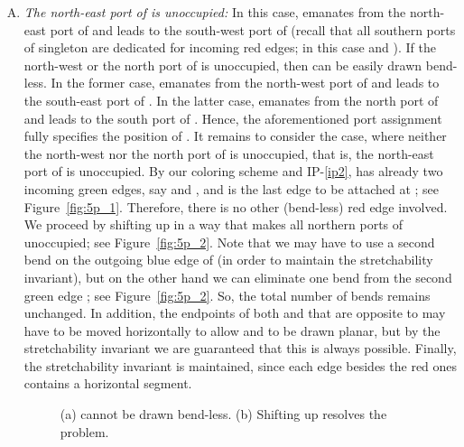 \documentclass[a4paper,twoside,11pt]{article}
\begin{document}
\begin{enumerate}[C.1:] 
  
\item \label{c1} \emph{The north-east port of  is unoccupied:}
In this case,  emanates from the north-east port of  and
leads to the south-west port of  (recall that all southern
ports of singleton  are dedicated for incoming red edges; in
this case  and ). If the north-west or the north port of
 is unoccupied, then  can be easily drawn bend-less. In
the former case,  emanates from the north-west port of 
and leads to the south-east port of . In the latter case, 
emanates from the north port of  and leads to the south port
of . Hence, the aforementioned port assignment fully specifies
the position of . It remains to consider the case, where
neither the north-west nor the north port of  is unoccupied,
that is, the north-east port of  is unoccupied. By our
coloring scheme and IP-\ref{ip2},  has already two incoming
green edges, say  and , and  is the last edge to be
attached at ; see Figure~\ref{fig:5p_1}. Therefore, there is
no other (bend-less) red edge involved. We proceed by shifting
 up in a way that makes all northern ports of 
unoccupied; see Figure~\ref{fig:5p_2}. Note that we may have to use
a second bend on the outgoing blue edge of  (in order to
maintain the stretchability invariant), but on the other hand we can
eliminate one bend from the second green edge ; see
Figure~\ref{fig:5p_2}. So, the total number of bends remains
unchanged. In addition, the endpoints of both  and  that
are opposite to  may have to be moved horizontally to allow
 and  to be drawn planar, but by the stretchability
invariant we are guaranteed that this is always possible. Finally,
the stretchability invariant is maintained, since each edge besides
the red ones contains a horizontal segment.

\begin{figure}[t!]
    \centering 
    \begin{minipage}[b]{.18\textwidth}
        \centering
    \end{minipage}
    \hfil
    \begin{minipage}[b]{.22\textwidth}
        \centering
    \end{minipage}
    \caption{ 
    (a)  cannot be drawn bend-less.
    (b) Shifting  up resolves the problem.}
    \label{fig:5p} 
\end{figure}


\end{enumerate}
\end{document}
